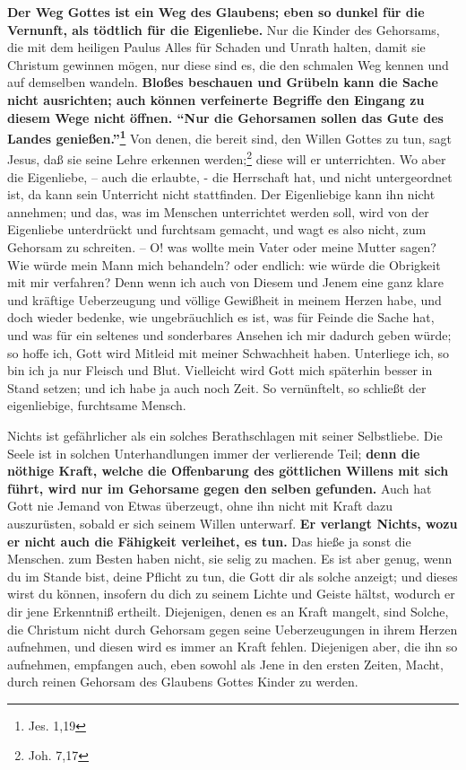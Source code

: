 \textbf{Der Weg Gottes ist ein Weg des Glaubens; eben so dunkel für die Vernunft, als
tödtlich für die Eigenliebe.} Nur die Kinder des Gehorsams, die mit dem heiligen
Paulus Alles für Schaden und Unrath halten, damit sie Christum gewinnen mögen,
nur diese sind es, die den schmalen Weg kennen und auf demselben wandeln. \textbf{Bloßes
beschauen und Grübeln kann die Sache nicht ausrichten; auch können verfeinerte
Begriffe den Eingang zu diesem Wege nicht öffnen. "`Nur die Gehorsamen sollen
das Gute des Landes genießen."'\footnote{Jes. 1,19}} Von denen, die bereit sind,
den Willen Gottes zu tun, sagt Jesus, daß sie seine Lehre erkennen
werden;\footnote{Joh. 7,17} diese will er unterrichten. Wo aber die Eigenliebe,
-- auch die erlaubte, - die Herrschaft hat, und nicht untergeordnet ist, da kann
sein Unterricht nicht stattfinden. Der Eigenliebige kann ihn nicht annehmen; und
das, was im Menschen unterrichtet werden soll, wird von der Eigenliebe
unterdrückt und furchtsam gemacht, und wagt es also nicht, zum Gehorsam zu
schreiten. -- O! was wollte mein Vater oder meine Mutter sagen? Wie würde mein
Mann mich behandeln? oder endlich: wie würde die Obrigkeit mit mir verfahren?
Denn wenn ich auch von Diesem und Jenem eine ganz klare und kräftige
Ueberzeugung und völlige Gewißheit in meinem Herzen habe, und doch wieder
bedenke, wie ungebräuchlich es ist, was für Feinde die Sache hat, und was für
ein seltenes und sonderbares Ansehen ich mir dadurch geben würde; so hoffe ich,
Gott wird Mitleid mit meiner Schwachheit haben. Unterliege ich, so bin ich ja
nur Fleisch und Blut. Vielleicht wird Gott mich späterhin besser in Stand
setzen; und ich habe ja auch noch Zeit. So vernünftelt, so schließt der
eigenliebige, furchtsame Mensch.

\medskip

Nichts ist gefährlicher als ein solches Berathschlagen mit seiner Selbstliebe.
Die Seele ist in solchen Unterhandlungen immer der verlierende Teil; \textbf{denn die
nöthige Kraft, welche die Offenbarung des göttlichen Willens mit sich führt,
wird nur im Gehorsame gegen den selben gefunden.} Auch hat Gott nie Jemand von
Etwas überzeugt, ohne ihn nicht mit Kraft dazu auszurüsten, sobald er sich
seinem Willen unterwarf. \textbf{Er verlangt Nichts, wozu er nicht auch die Fähigkeit
verleihet, es tun.} Das hieße ja sonst die Menschen. zum Besten haben nicht, sie
selig zu machen. Es ist aber genug, wenn du im Stande bist, deine Pflicht zu
tun, die Gott dir als solche anzeigt; und dieses wirst du können, insofern du
dich zu seinem Lichte und Geiste hältst, wodurch er dir jene Erkenntniß
ertheilt. Diejenigen, denen es an Kraft mangelt, sind Solche, die Christum nicht
durch Gehorsam gegen seine Ueberzeugungen in ihrem Herzen aufnehmen, und diesen
wird es immer an Kraft fehlen. Diejenigen aber, die ihn so aufnehmen, empfangen
auch, eben sowohl als Jene in den ersten Zeiten, Macht, durch reinen Gehorsam
des Glaubens Gottes Kinder zu werden.

